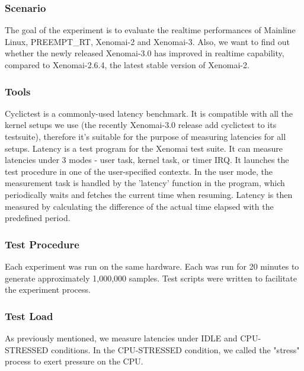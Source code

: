 \documentclass[10pt,a4paper]{article}
\begin{document}
\begin{multicols}{2}
\subsubsection{Scenario}
The goal of the experiment is to evaluate the realtime performances of Mainline Linux, PREEMPT\_RT, 
Xenomai-2 and Xenomai-3. Also, we want to find out whether the newly released Xenomai-3.0 has improved in realtime capability, compared to Xenomai-2.6.4, the latest stable version of Xenomai-2.
\subsubsection{Tools}
Cyclictest is a commonly-used latency benchmark. It is compatible with all the kernel setups we use (the recently Xenomai-3.0 release add cyclictest to its testsuite), therefore it's suitable for the purpose of measuring latencies for all setups.
Latency is a test program for the Xenomai test suite. It can measure latencies under 3 modes - user task, kernel task, or timer IRQ. It launches the test procedure in one of the user-specified contexts. In the user mode, the measurement task is handled by the 'latency' function in the program, which periodically waits and fetches the current time when resuming. Latency is then measured by calculating the difference of the actual time elapsed with the predefined period.
\subsubsection{Test Procedure}
Each experiment was run on the same hardware. Each was run for 20 minutes to generate approximately 1,000,000 samples. Test scripts were written to facilitate the experiment process.
\subsubsection{Test Load}
As previously mentioned, we measure latencies under IDLE and CPU-STRESSED conditions. In the CPU-STRESSED condition, we called the "stress" process to exert pressure on the CPU.

\end{multicols}
\end{document}
